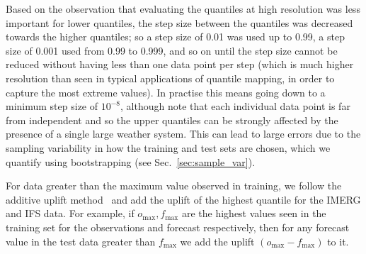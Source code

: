 \documentclass[../main.tex]{subfiles}
\begin{document}
Based on the observation that evaluating the quantiles at high resolution was less important for lower quantiles, the step size between the quantiles was decreased towards the higher quantiles; so a step size of 0.01 was used up to 0.99, a step size of 0.001 used from 0.99 to 0.999, and so on until the step size cannot be reduced without having less than one data point per step (which is much higher resolution than seen in typical applications of quantile mapping, in order to capture the most extreme values). In practise this means going down to a minimum step size of $10^{-8}$, although note that each individual data point is far from independent and so the upper quantiles can be strongly affected by the presence of a single large weather system. This can lead to large errors due to the sampling variability in how the training and test sets are chosen, which we quantify using bootstrapping (see Sec.~\ref{sec:sample_var}).



For data greater than the maximum value observed in training, we follow the additive uplift method~\citep{boe_statistical_2007, deque_frequency_2007} and add the uplift of the highest quantile for the IMERG and IFS data. For example, if $o_{\text{max}},f_{\text{max}}$ are the highest values seen in the training set for the observations and forecast respectively, then for any forecast value in the test data greater than $f_{\text{max}}$ we add the uplift $(o_{\text{max}} - f_{\text{max}})$ to it. 
\end{document}
